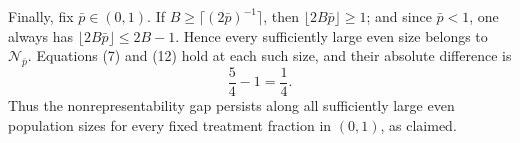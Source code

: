 Finally, fix \(\bar p\in(0,1)\).  If \(B\ge\lceil(2\bar p)^{-1}\rceil\), then \(\lfloor2B\bar p\rfloor\ge1\); and since \(\bar p<1\), one always has \(\lfloor2B\bar p\rfloor\le2B-1\).  Hence every sufficiently large even size belongs to \(\mathcal N_{\bar p}\).  Equations (7) and (12) hold at each such size, and their absolute difference is
\[
 \frac54-1=\frac14.
\]
Thus the nonrepresentability gap persists along all sufficiently large even population sizes for every fixed treatment fraction in \((0,1)\), as claimed.